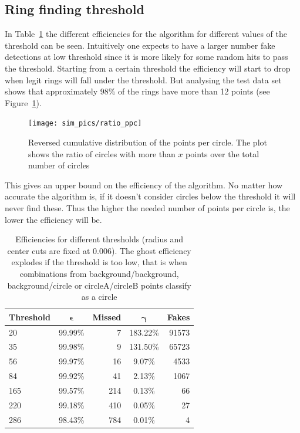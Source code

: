 \documentclass[11pt]{scrreprt}
\begin{document}
\subsection{Ring finding threshold} %
\label{sub:different_thresholds2}

In Table~\ref{tab:threshold_cuts} the different efficiencies for the algorithm for different values of the threshold can be seen. 
Intuitively one expects to have a larger number fake detections at low threshold since it is more likely for some random hits to pass 
the threshold. Starting from a certain threshold the efficiency will start to drop when legit rings will fall under the threshold. But
analysing the test data set shows that approximately $98\%$ of the rings have more than 12 points (see Figure~\ref{fig:ratio_ppc}).

\begin{figure}[tb]
  \centering
  \texttt{[image: sim\_pics/ratio\_ppc]}
  \caption{Reversed cumulative distribution of the points per circle. The plot shows the ratio of circles with more than $x$ points over the
  total number of circles}
  \label{fig:ratio_ppc}
\end{figure}

This gives an upper bound on the efficiency of the algorithm. No matter 
how accurate the algorithm is, if it doesn't consider circles below the threshold it will never find these. Thus the higher 
the needed number of points per circle is, the lower the efficiency will be. 


\begin{table}[tb]
  \caption[Efficiencies for different thresholds]{Efficiencies for different thresholds (radius and center cuts are fixed at $0.006$). The ghost efficiency explodes if the threshold is too low, that is when combinations
  from background/background, background/circle or circleA/circleB points classify as a circle}
  \label{tab:threshold_cuts}
  \centering

  \begin{tabular}{lcrcr}
  \toprule
  \textbf{Threshold} & $\boldsymbol{\epsilon}$ & \textbf{Missed} & $\boldsymbol{\gamma}$ & \textbf{Fakes} \\
  \midrule
  20  & 99.99\% & 7 & 183.22\% & 91573 \\
  35  & 99.98\% & 9 & 131.50\% & 65723 \\
  56  & 99.97\% & 16 & 9.07\% & 4533 \\
  84  & 99.92\% & 41 & 2.13\% & 1067 \\
  165 & 99.57\% & 214 & 0.13\% & 66 \\
  220 & 99.18\% & 410 & 0.05\% & 27 \\
  286 & 98.43\% & 784 & 0.01\% & 4 \\
  \bottomrule
  \end{tabular}
\end{table}
\end{document}

